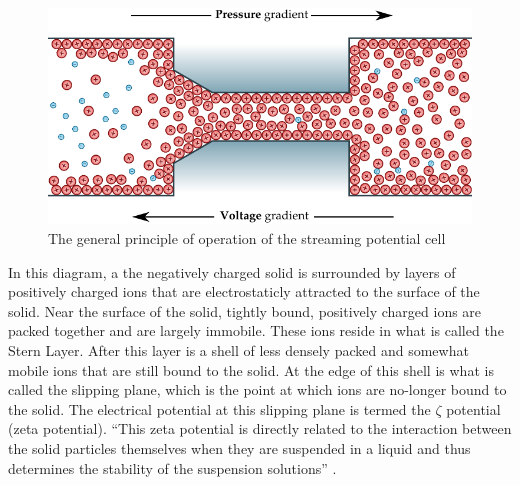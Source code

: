 \begin{figure} \centering
    \includegraphics{content/pt1/01-PowerHarvesting/graphics/streamingCellPrinciple}
    \caption{\label{fig:streamingCellPrinciple}The general principle of
        operation of the streaming potential cell} \end{figure} In this
diagram, a the negatively charged solid is surrounded by layers of positively
charged ions that are electrostaticly attracted to the surface of the solid.
Near the surface of the solid, tightly bound, positively charged ions are
packed together and are largely immobile.  These ions reside in what is called
the Stern Layer. After this layer is a shell of less densely packed and
somewhat mobile ions that are still bound to the solid. At the edge of this
shell is what is called the slipping plane, which is the point at which ions
are no-longer bound to the solid. The electrical potential at this slipping
plane is termed the $\zeta$ potential (zeta potential). ``This zeta potential
is directly related to the interaction between the solid particles themselves
when they are suspended in a liquid and thus determines the stability of the
suspension solutions'' \cite{Gu2000}.




